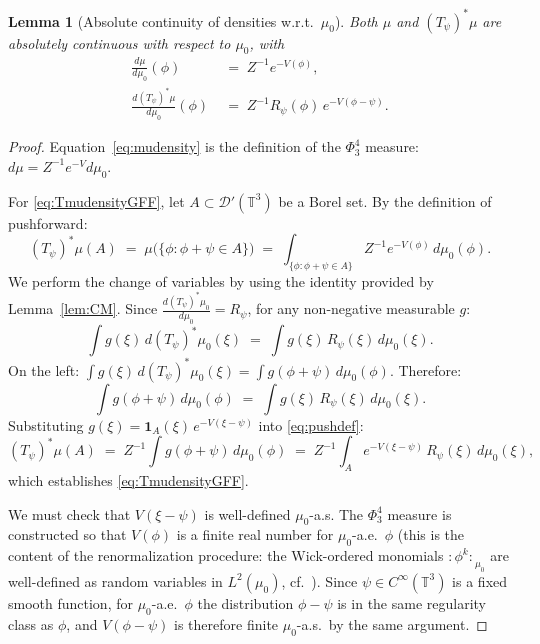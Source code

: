 \documentclass[12pt]{article}
\newtheorem{lemma}[theorem]{Lemma}
\theoremstyle{definition}
\begin{document}
\begin{lemma}[Absolute continuity of densities w.r.t.\ $\mu_0$]
\label{lem:densities}
Both $\mu$ and $(T_\psi)^*\mu$ are absolutely continuous with respect to $\mu_0$, with
\begin{align}
  \frac{d\mu}{d\mu_0}(\phi)
  &\;=\; Z^{-1}e^{-V(\phi)},
  \label{eq:mudensity}\\
  \frac{d(T_\psi)^*\mu}{d\mu_0}(\phi)
  &\;=\; Z^{-1}R_\psi(\phi)\, e^{-V(\phi-\psi)}.
  \label{eq:TmudensityGFF}
\end{align}
\end{lemma}

\begin{proof}
Equation~\eqref{eq:mudensity} is the definition of the $\Phi^4_3$ measure: $d\mu = Z^{-1}e^{-V}d\mu_0$.

For \eqref{eq:TmudensityGFF}, let $A\subset\mathcal{D}'(\mathbb{T}^3)$ be a Borel set.  By the
definition of pushforward:
\begin{equation}
  (T_\psi)^*\mu(A)
  \;=\; \mu\bigl(\{\phi : \phi + \psi \in A\}\bigr)
  \;=\; \int_{\{\phi:\phi+\psi\in A\}} Z^{-1}e^{-V(\phi)}\,d\mu_0(\phi).
  \label{eq:pushdef}
\end{equation}
We perform the change of variables by using the identity provided by Lemma~\ref{lem:CM}.
Since $\frac{d(T_\psi)^*\mu_0}{d\mu_0} = R_\psi$, for any non-negative measurable $g$:
\[
  \int g(\xi)\,d(T_\psi)^*\mu_0(\xi)
  \;=\; \int g(\xi)\, R_\psi(\xi)\,d\mu_0(\xi).
\]
On the left: $\int g(\xi)\,d(T_\psi)^*\mu_0(\xi) = \int g(\phi+\psi)\,d\mu_0(\phi)$.
Therefore:
\begin{equation}
  \int g(\phi+\psi)\,d\mu_0(\phi)
  \;=\; \int g(\xi)\, R_\psi(\xi)\,d\mu_0(\xi).
  \label{eq:CMformula}
\end{equation}
Substituting $g(\xi) = \mathbf{1}_A(\xi)\, e^{-V(\xi-\psi)}$ into \eqref{eq:pushdef}:
\[
  (T_\psi)^*\mu(A)
  \;=\; Z^{-1}\int g(\phi+\psi)\,d\mu_0(\phi)
  \;=\; Z^{-1}\int_A e^{-V(\xi-\psi)}\, R_\psi(\xi)\,d\mu_0(\xi),
\]
which establishes \eqref{eq:TmudensityGFF}.

We must check that $V(\xi-\psi)$ is well-defined $\mu_0$-a.s.  The $\Phi^4_3$ measure is
constructed so that $V(\phi)$ is a finite real number for $\mu_0$-a.e.\ $\phi$ (this is the
content of the renormalization procedure: the Wick-ordered monomials ${:\phi^k:}_{\mu_0}$
are well-defined as random variables in $L^2(\mu_0)$, cf.\ \cite[Section 4]{GubinelliHofmanova2019}).
Since $\psi\in C^\infty(\mathbb{T}^3)$ is a fixed smooth function, for $\mu_0$-a.e.\ $\phi$
the distribution $\phi - \psi$ is in the same regularity class as $\phi$, and
$V(\phi-\psi)$ is therefore finite $\mu_0$-a.s.\ by the same argument.
\end{proof}
\end{document}
